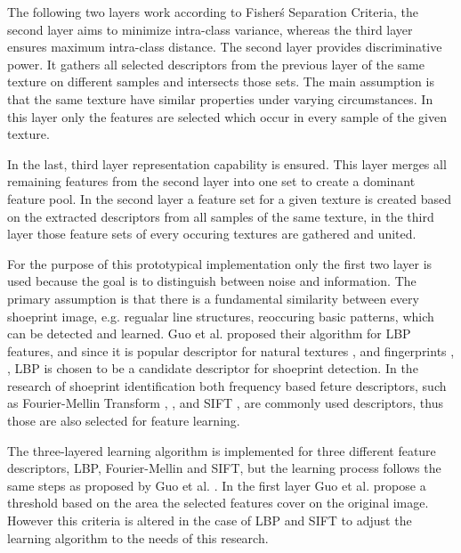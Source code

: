 \documentclass[draft,final]{vutinfth} %
\begin{document}
\par
The following two layers work according to Fisher\'s Separation Criteria, the second layer aims to minimize intra-class variance, whereas the third layer ensures maximum intra-class distance. 
The second layer provides discriminative power.
It gathers all selected descriptors from the previous layer of the same texture on different samples and intersects those sets.
The main assumption is that the same texture have similar properties under varying circumstances.
In this layer only the features are selected which occur in every sample of the given texture.
\par
In the last, third layer representation capability is ensured.
This layer merges all remaining features from the second layer into one set to create a dominant feature pool.
In the second layer a feature set for a given texture is created based on the extracted descriptors from all samples of the same texture, in the third layer those feature sets of every occuring textures are gathered and united.
\par
For the purpose of this prototypical implementation only the first two layer is used because the goal is to distinguish between noise and information.
The primary assumption is that there is a fundamental similarity between every shoeprint image, e.g. regualar line structures, reoccuring basic patterns, which can be detected and learned.
Guo et al. \cite{guo2012discriminative} proposed their algorithm for LBP features, and since it is popular descriptor for natural textures \cite{hong2014combining}, \cite{ahonen2009rotation} and fingerprints \cite{wang2013pixel}, \cite{rida2018palmprint}, LBP is chosen to be a candidate descriptor for shoeprint detection.
In the research of shoeprint identification both frequency based feture descriptors, such as Fourier-Mellin Transform \cite{wu2019crime}, \cite{gueham2008automatic}, and SIFT \cite{nibouche2009rotation}, \cite{richetelli2017classification} are commonly used descriptors, thus those are also selected for feature learning.
\par
The three-layered learning algorithm is implemented for three different feature descriptors, LBP, Fourier-Mellin and SIFT, but the learning process follows the same steps as proposed by Guo et al. \cite{guo2012discriminative}.
In the first layer Guo et al. \cite{guo2012discriminative} propose a threshold based on the area the selected features cover on the original image.
However this criteria is altered in the case of LBP and SIFT to adjust the learning algorithm to the needs of this research.
\end{document}
